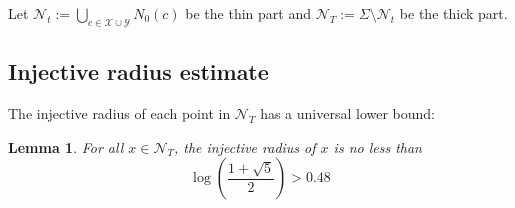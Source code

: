 \documentclass[11pt, a4paper]{article}
\newtheorem{lemma}[thm]{Lemma}
\theoremstyle{definition}
\theoremstyle{remark}
\newcommand{\caln}{\mathcal{N}}
\newcommand{\calx}{\mathcal{X}}
\newcommand{\caly}{\mathcal{Y}}
\newcommand{\bracket}[1]{\left( #1 \right)}
\begin{document}

Let $\caln_t:=\bigcup_{c\in\calx\cup\caly}N_0(c)$ be the thin part and $\caln_T:=\Sigma\setminus\caln_t$ be the thick part.

\subsection{Injective radius estimate}

The injective radius of each point in $\caln_T$ has a universal lower bound:

\begin{lemma}\label{lemma:inj_radius_outside_nbhds}
  For all $x\in\caln_T$, the injective radius of $x$ is no less than 
$$\log\bracket{\frac{1+\sqrt5}2}>0.48$$
\end{lemma}
\end{document}
